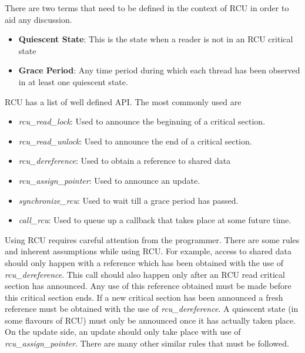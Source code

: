 There are two terms that need to be defined in the context of RCU in order to aid
any discussion.
\begin{itemize}
\item{\bf Quiescent State}: This is the state when a reader is not in an RCU critical state
\item{\bf Grace Period}: Any time period during which each thread has been observed in at least one quiescent state.
\end{itemize}

RCU has a list of well defined API. The most commonly used are
\begin{itemize}
\item\emph{rcu\_read\_lock}: Used to announce the beginning of a critical section.
\item\emph{rcu\_read\_unlock}: Used to announce the end of a critical section.
\item\emph{rcu\_dereference}: Used to obtain a reference to shared data
\item\emph{rcu\_assign\_pointer}: Used to announce an update.
\item\emph{synchronize\_rcu}: Used to wait till a grace period has passed.
\item\emph{call\_rcu}: Used to queue up a callback that takes place at some future time.
\end{itemize}


Using RCU requires careful attention from the programmer. There are some rules
and inherent assumptions while using RCU. For example, access to shared data
should only happen with a reference which has been obtained with the use of
\emph{rcu\_dereference}. This call should also happen only after an RCU read critical
section has announced. Any use of this reference obtained must be made before
this critical section ends. If a new critical section has been announced a
fresh reference must be obtained with the use of \emph{rcu\_dereference}. A quiescent
state (in some flavours of RCU) must only be announced once it has actually
taken place. On the update side, an update should only take place with use
of \emph{rcu\_assign\_pointer}. There are many other similar rules that must be
followed.
